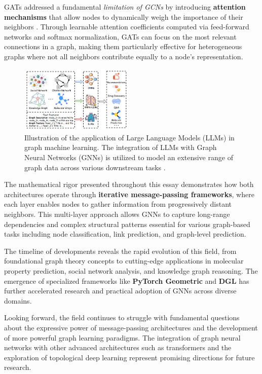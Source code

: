 \documentclass{article}
\begin{document}
GATs addressed a fundamental \textit{limitation of GCNs} by introducing \textbf{attention mechanisms} that allow nodes to dynamically weigh the importance of their neighbors \cite{veličković2018graphattentionnetworks}.
Through learnable attention coefficients computed via feed-forward networks and softmax normalization, GATs can focus on the most relevant connections in a graph, making them particularly effective for heterogeneous graphs where not all neighbors contribute equally to a node's representation.

\begin{figure}
      \centering
      \includegraphics[width=0.48\textwidth]{../assets/gnn_applications.png}
      \caption{Illustration of the application of Large Language Models (LLMs) in graph machine learning. The integration of LLMs with Graph Neural Networks (GNNs) is utilized to model an extensive range of graph data across various downstream tasks \cite{fan2024graphmachinelearningera}.}
      \label{fig:gnn-applications}
\end{figure}

The mathematical rigor presented throughout this essay demonstrates how both architectures operate through \textbf{iterative message-passing frameworks}, where each layer enables nodes to gather information from progressively distant neighbors.
This multi-layer approach allows GNNs to capture long-range dependencies and complex structural patterns essential for various graph-based tasks including node classification, link prediction, and graph-level prediction.

The timeline of developments reveals the rapid evolution of this field, from foundational graph theory concepts to cutting-edge applications in molecular property prediction, social network analysis, and knowledge graph reasoning.
The emergence of specialized frameworks like \textbf{PyTorch Geometric} and \textbf{DGL} \cite{pytorch_geometric,dgl} has further accelerated research and practical adoption of GNNs across diverse domains.

Looking forward, the field continues to struggle with fundamental questions about the expressive power of message-passing architectures and the development of more powerful graph learning paradigms.
The integration of graph neural networks with other advanced architectures such as transformers and the exploration of topological deep learning represent promising directions for future research.
\end{document}
